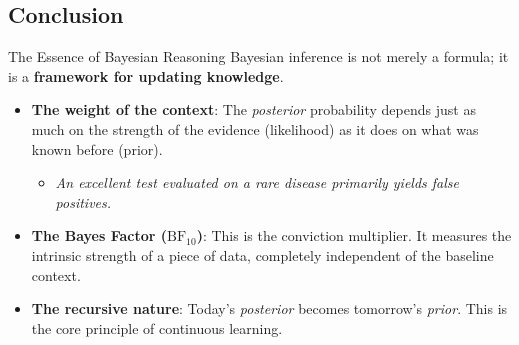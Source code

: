 \subsection{Conclusion}

\begin{frame}{The Essence of Bayesian Reasoning}
	Bayesian inference is not merely a formula; it is a \textbf{framework for updating knowledge}.
	\vspace{0.3cm}
	\begin{itemize}
		\item \textbf{The weight of the context}: The \textit{posterior} probability depends just as much on the strength of the evidence (likelihood) as it does on what was known before (prior). 
		\begin{itemize}
			\item[$\rightarrow$] \textit{An excellent test evaluated on a rare disease primarily yields false positives.}
		\end{itemize}
		\pause
		\item \textbf{The Bayes Factor ($\text{BF}_{10}$)}: This is the conviction multiplier. It measures the intrinsic strength of a piece of data, completely independent of the baseline context.
		\pause
		\item \textbf{The recursive nature}: Today's \textit{posterior} becomes tomorrow's \textit{prior}. This is the core principle of continuous learning.
	\end{itemize}
\end{frame}